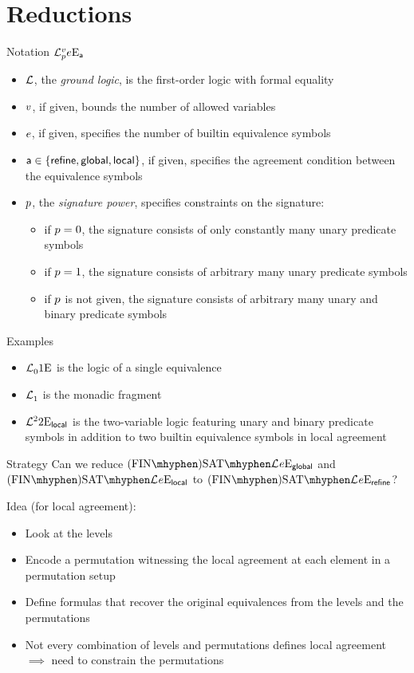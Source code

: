 \documentclass{beamer}
\begin{document}
\section{Reductions}
\begin{frame}{Notation}
$\mathcal{L}^{v}_{p}{e}\mathrm{E}_{\mathsf{a}}$
\begin{itemize}
  \item $\mathcal{L}$, the \emph{ground logic}, is the first-order logic with formal
  equality
  \item $v$, if given, bounds the number of allowed variables
  \item $e$, if given, specifies the number of builtin equivalence symbols
  \item $\mathsf{a}\in\left\{\mathsf{refine},\mathsf{global},\mathsf{local}\right\}$, if given, specifies the
  agreement condition between the equivalence symbols
  \item $p$, the \emph{signature power}, specifies constraints on the
  signature:
  \begin{itemize}
    \item if $p = 0$, the signature consists of only constantly many unary
    predicate symbols
    \item if $p = 1$, the signature consists of arbitrary many unary
    predicate symbols
    \item if $p$ is not given, the signature consists of arbitrary many unary
    and binary predicate symbols
  \end{itemize}
\end{itemize}
\end{frame}

\begin{frame}{Examples}
\begin{itemize}
  \item $\mathcal{L}^{{}}_{0}{1}\mathrm{E}_{{}}$ is the logic of a single equivalence
  \item $\mathcal{L}^{{}}_{1}$ is the monadic fragment
  \item $\mathcal{L}^{2}_{{}}{2}\mathrm{E}_{\mathsf{local}}$ is the two-variable logic featuring unary
  and binary predicate symbols in addition to two builtin equivalence symbols in
  local agreement
\end{itemize}
\end{frame}

\begin{frame}{Strategy}
Can we reduce $\FinASat{\Lvp\LL\nonv\nopow\Eea\sze\agglobal}$ and
$\FinASat{\Lvp\LL\nonv\nopow\Eea\sze\aglocal}$ to
$\FinASat{\Lvp\LL\nonv\nopow\Eea\sze\agrefine}$?
\pause

Idea (for local agreement):
\begin{itemize}
  \item Look at the levels
  \item Encode a permutation witnessing the local agreement at each element in a
  permutation setup
  \item Define formulas that recover the original equivalences from the
  levels and the permutations
  \item Not every combination of levels and permutations defines
  local agreement $\implies$ need to constrain the permutations
\end{itemize}
\end{frame}
\end{document}
